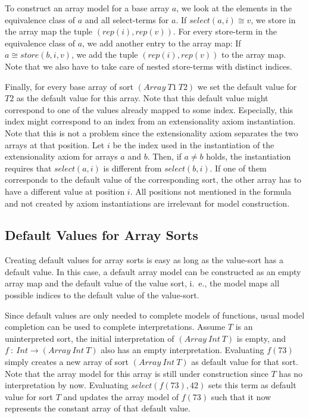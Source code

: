 \documentclass[a4paper,12pt]{article}
\begin{document}
To construct an array model for a base array $a$, we look at the elements in
the equivalence class of $a$ and all select-terms for $a$.  If $select(a,i)
\cong v$, we store in the array map the tuple $(rep(i), rep(v))$.  For every
store-term in the equivalence class of $a$, we add another entry to the array
map:  If $a\cong store(b,i,v)$, we add the tuple $(rep(i), rep(v))$ to the
array map.  Note that we also have to take care of nested store-terms with
distinct indices.

Finally, for every base array of sort $(Array\ T1\ T2)$ we set the default value
for $T2$ as the default value for this array.  Note that this default value
might correspond to one of the values already mapped to some index.
Especially, this index might correspond to an index from an extensionality
axiom instantiation.  Note that this is not a problem since the extensionality
axiom separates the two arrays at that position.  Let $i$ be the index used in
the instantiation of the extensionality axiom for arrays $a$ and $b$.  Then,
if $a\neq b$ holds, the instantiation requires that $select(a,i)$ is different
from $select(b,i)$.  If one of them corresponds to the default value of the
corresponding sort, the other array has to have a different value at position
$i$.  All positions not mentioned in the formula and not created by axiom
instantiations are irrelevant for model construction.

\subsection{Default Values for Array Sorts}
Creating default values for array sorts is easy as long as the value-sort has
a default value.  In this case, a default array model can be constructed as an
empty array map and the default value of the value sort, i.~e., the model maps
all possible indices to the default value of the value-sort.

Since default values are only needed to complete models of functions, usual
model completion can be used to complete interpretations.  Assume $T$ is an
uninterpreted sort, the initial interpretation of $(Array\ Int\ T)$ is empty,
and $f\ :\ Int\rightarrow (Array\ Int\ T)$ also has an empty interpretation.
Evaluating $f(73)$ simply creates a new array of sort $(Array\ Int\ T)$ as
default value for that sort.  Note that the array model for this array is
still under construction since $T$ has no interpretation by now.  Evaluating
$select(f(73),42)$ sets this term as default value for sort $T$ and updates
the array model of $f(73)$ such that it now represents the constant array of
that default value.
\end{document}
